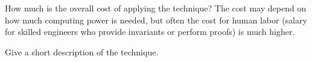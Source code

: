 \documentclass[a4paper]{article}
\begin{document}
\begin{landscape}
\begin{minipage}[t]{0.2\linewidth}
\begin{betterlist}
\begin{betterlist}
			\item How much is the overall cost of applying the technique? The cost may depend on how much computing power is needed, but often the cost for human labor (salary for skilled engineers who provide invariants or perform proofs) is much higher.

		\end{betterlist}
	\end{betterlist}
\end{minipage}
\begin{minipage}[t]{0.2\linewidth}
	\raggedright
	\begin{betterlist}
		\item Give a short description of the technique.


\end{betterlist}
\end{minipage}
\end{landscape}
\end{document}
